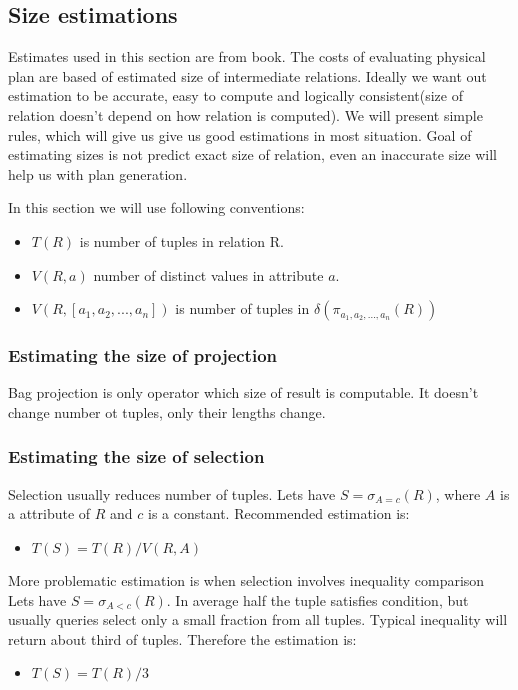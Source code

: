 \subsection{Size estimations}
Estimates used in this section are from book\cite{database}. 
The costs of evaluating physical plan are based of estimated size of interme\-dia\-te relations. Ideally we want out estimation to be accurate, easy to compute and logically consistent(size of relation doesn't depend on how relation is computed). We will present simple rules, which will give us give us good estimations in most situation. Goal of estimating sizes is not predict exact size of relation, even an inaccurate size will help us with plan generation.

In this section we will use following conventions:

\begin{itemize}
\item $T(R)$ is number of tuples in relation R.
\item $V(R,a)$ number of distinct values in attribute $a$. 
\item $V(R,[a_1,a_2,...,a_n])$ is number of tuples in $\delta(\pi_{a_1,a_2,...,a_n}(R))$
\end{itemize}

\subsubsection{Estimating the size of projection}

Bag projection is only operator which size of result is computable. It doesn't change number ot tuples, only their lengths change.

\subsubsection{Estimating the size of selection}

Selection usually reduces number of tuples. Lets have $S=\sigma_{A=c}(R)$, where $A$ is a attribute of $R$ and $c$ is a constant. Recommended estimation is:
\begin{itemize}
\item $T(S)=T(R)/V(R,A)$
\end{itemize}

More problematic estimation is when selection involves inequality comparison Lets have $S=\sigma_{A<c}(R)$. In average half the tuple satisfies condition, but usually queries select only a small fraction from all tuples. Typical inequality will return about third of tuples. Therefore the estimation is:
\begin{itemize}
\item $T(S)=T(R)/3$
\end{itemize}

